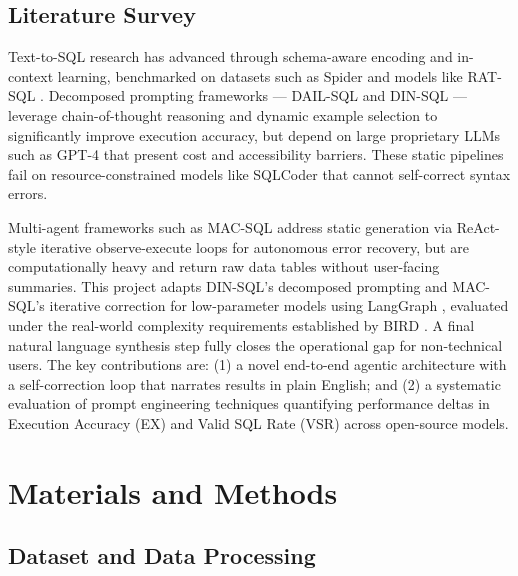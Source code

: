 \documentclass{article}
\begin{document}
\subsection{Literature Survey}

Text-to-SQL research has advanced through schema-aware encoding and in-context learning, benchmarked on datasets such as Spider \cite{spider2018} and models like RAT-SQL \cite{ratsql2020}. Decomposed prompting frameworks --- DAIL-SQL \cite{gao2024dail} and DIN-SQL \cite{pourreza2023din} --- leverage chain-of-thought reasoning \cite{wei2022cot} and dynamic example selection to significantly improve execution accuracy, but depend on large proprietary LLMs such as GPT-4 \cite{openai2023gpt4} that present cost and accessibility barriers. These static pipelines fail on resource-constrained models like SQLCoder \cite{defog2023sqlcoder} that cannot self-correct syntax errors.

Multi-agent frameworks such as MAC-SQL \cite{wang2023macsql} address static generation via ReAct-style \cite{yao2023react} iterative observe-execute loops for autonomous error recovery, but are computationally heavy and return raw data tables without user-facing summaries. This project adapts DIN-SQL's decomposed prompting and MAC-SQL's iterative correction for low-parameter models using LangGraph \cite{langchain2024langgraph}, evaluated under the real-world complexity requirements established by BIRD \cite{li2023bird, katsogiannis2023survey}. A final natural language synthesis step fully closes the operational gap for non-technical users. The key contributions are: (1) a novel end-to-end agentic architecture with a self-correction loop that narrates results in plain English; and (2) a systematic evaluation of prompt engineering techniques quantifying performance deltas in Execution Accuracy (EX) and Valid SQL Rate (VSR) across open-source models.

\section{Materials and Methods}

\subsection{Dataset and Data Processing}
\end{document}
